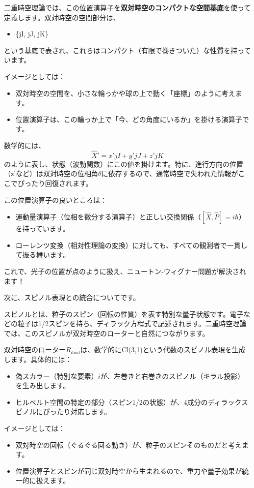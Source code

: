 \documentclass[dvipdfmx,12pt,a4paper]{article}
\begin{document}
二重時空理論では、この位置演算子を\textbf{双対時空のコンパクトな空間基底}を使って定義します。双対時空の空間部分は、
\begin{itemize}
  \item \{jI, jJ, jK\}
\end{itemize}
という基底で表され、これらはコンパクト（有限で巻きついた）な性質を持っています。

イメージとしては：
\begin{itemize}
  \item 双対時空の空間を、小さな輪っかや球の上で動く「座標」のように考えます。
  \item 位置演算子は、この輪っか上で「今、どの角度にいるか」を掛ける演算子です。
\end{itemize}

数学的には、
\[
\hat{X}' = x' jI + y' jJ + z' jK
\]
のように表し、状態（波動関数）にこの値を掛けます。特に、進行方向の位置（z'など）は双対時空の位相角$\theta$に依存するので、通常時空で失われた情報がここでぴったり回復されます。

この位置演算子の良いところは：
\begin{itemize}
  \item 運動量演算子（位相を微分する演算子）と正しい交換関係（$[\hat{X}, \hat{P}] = i\hbar$）を持っています。
  \item ローレンツ変換（相対性理論の変換）に対しても、すべての観測者で一貫して振る舞います。
\end{itemize}

これで、光子の位置が点のように扱え、ニュートン‐ウィグナー問題が解決されます！

次に、スピノル表現との統合についてです。

スピノルとは、粒子のスピン（回転の性質）を表す特別な量子状態です。電子などの粒子は1/2スピンを持ち、ディラック方程式で記述されます。二重時空理論では、このスピノルが双対時空のローターと自然につながります。

双対時空のローター$R_{\text{dual}}$は、数学的にCl(3,1)という代数のスピノル表現を生成します。具体的には：
\begin{itemize}
  \item 偽スカラー（特別な要素）$i$が、左巻きと右巻きのスピノル（キラル投影）を生み出します。
  \item ヒルベルト空間の特定の部分（スピン1/2の状態）が、4成分のディラックスピノルにぴったり対応します。
\end{itemize}

イメージとしては：
\begin{itemize}
  \item 双対時空の回転（ぐるぐる回る動き）が、粒子のスピンそのものだと考えます。
  \item 位置演算子とスピンが同じ双対時空から生まれるので、重力や量子効果が統一的に扱えます。
\end{itemize}
\end{document}

